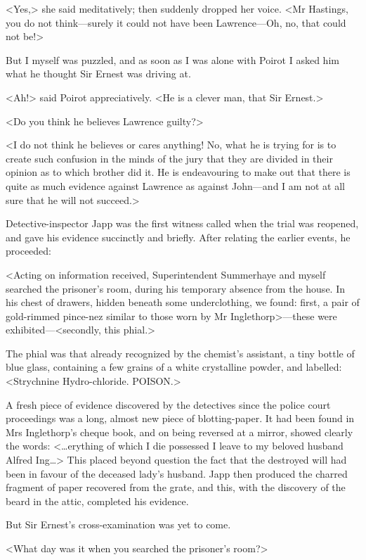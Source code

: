  <Yes,> she said meditatively; then suddenly dropped her voice. <Mr Hastings, you do not think—surely it could not have been Lawrence—Oh, no, that could not be!> 

 But I myself was puzzled, and as soon as I was alone with Poirot I asked him what he thought Sir Ernest was driving at. 

 <Ah!> said Poirot appreciatively. <He is a clever man, that Sir Ernest.> 

 <Do you think he believes Lawrence guilty?> 

 <I do not think he believes or cares anything! No, what he is trying for is to create such confusion in the minds of the jury that they are divided in their opinion as to which brother did it. He is endeavouring to make out that there is quite as much evidence against Lawrence as against John—and I am not at all sure that he will not succeed.> 

 Detective-inspector Japp was the first witness called when the trial was reopened, and gave his evidence succinctly and briefly. After relating the earlier events, he proceeded: 

 <Acting on information received, Superintendent Summerhaye and myself searched the prisoner's room, during his temporary absence from the house. In his chest of drawers, hidden beneath some underclothing, we found: first, a pair of gold-rimmed pince-nez similar to those worn by Mr Inglethorp>—these were exhibited—<secondly, this phial.> 

 The phial was that already recognized by the chemist's assistant, a tiny bottle of blue glass, containing a few grains of a white crystalline powder, and labelled: <Strychnine Hydro-chloride. POISON.> 

 A fresh piece of evidence discovered by the detectives since the police court proceedings was a long, almost new piece of blotting-paper. It had been found in Mrs Inglethorp's cheque book, and on being reversed at a mirror, showed clearly the words: <\dots erything of which I die possessed I leave to my beloved husband Alfred Ing\dots> This placed beyond question the fact that the destroyed will had been in favour of the deceased lady's husband. Japp then produced the charred fragment of paper recovered from the grate, and this, with the discovery of the beard in the attic, completed his evidence. 

 But Sir Ernest's cross-examination was yet to come. 

 <What day was it when you searched the prisoner's room?> 

